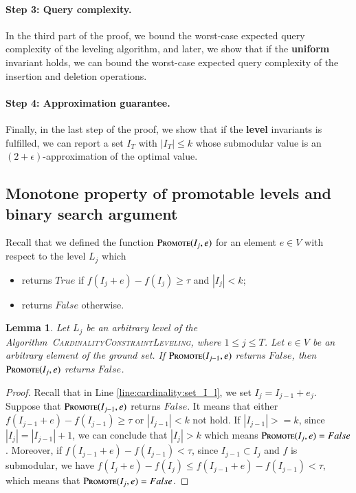 \documentclass[11pt]{article}
\newtheorem{lemma}[theorem]{Lemma}
\newcommand{\suit}{\textsc{Promote}}
\newcommand{\levelingconstraint}{\textsc{CardinalityConstraintLeveling}}
\newcommand{\marginalgain}[2]{f(#2 + #1) - f(#2)}
\begin{document}
\paragraph{Step 3: Query complexity.}
In the third part of the proof, we bound 
the worst-case expected  query complexity of the leveling algorithm, and later,  we show that if the \textbf{uniform} invariant holds, we can bound the worst-case expected query complexity of the insertion and deletion operations. 

\paragraph{Step 4: Approximation guarantee.}
Finally, in the last step of the proof, we show that if the \textbf{level} invariants 
is fulfilled, we can report a set $I_T$ with $|I_T|\le k$ 
whose submodular value is an $(2+\epsilon)$-approximation of the optimal value. 


\subsection{Monotone property of promotable levels and binary search argument}
Recall that we defined the function 
$\suit(I_j, e)$ for an element $e \in V$ 
with respect to the level $L_j$ which 
\begin{itemize}
    \item returns $True$ if $\marginalgain{e}{I_j} \ge \tau$  and  $|I_j| < k$;
    \item returns $False$ otherwise.
\end{itemize}

\begin{lemma}
\label{lm:cardinality:binary_search_argument}
Let $L_j$ be an arbitrary level of the Algorithm~\levelingconstraint{}, where $1 \le j \le T$. 
Let $e \in V$ be an arbitrary element of the ground set. 
If $\suit(I_{j-1}, e)$ returns $False$, then 
$\suit(I_j, e)$ returns $False$. 
\end{lemma}   

\begin{proof}
Recall that in Line \ref{line:cardinality:set_I_l}, we set $I_j = I_{j-1} + e_j$.
Suppose that $\suit(I_{j-1}, e)$ returns $False$. 
It means that either $\marginalgain{e}{I_{j-1}} \ge \tau$  or  $|I_{j-1}| < k$ not hold.
If $|I_{j-1}| >=k$, since $|I_j| = |I_{j-1}|+1$, we can conclude that $|I_j| > k$ which means $\suit(I_j, e) = False$.
Moreover, if $\marginalgain{e}{I_{j-1}} < \tau$, since $I_{j-1} \subset I_j$ and $f$ is submodular, we have $\marginalgain{e}{I_j} \le \marginalgain{e}{I_{j-1}} < \tau$, which means that $\suit(I_j, e) = False$.
\end{proof}
\end{document}
